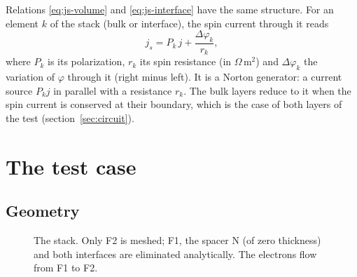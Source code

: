 \documentclass[11pt,a4paper]{article}
\newcommand{\vm}{\bm{m}}
\begin{document}
Relations \eqref{eq:js-volume} and \eqref{eq:js-interface} have the same
structure. For an element $k$ of the stack (bulk or interface), the spin
current through it reads
\begin{equation}
  j_s = P_k\,j + \frac{\Delta\varphi_k}{r_k},
  \label{eq:element}
\end{equation}
where $P_k$ is its polarization, $r_k$ its spin resistance (in
$\Omega\,$m$^2$) and $\Delta\varphi_k$ the variation of $\varphi$ through
it (right minus left). It is a Norton generator: a current source $P_kj$
in parallel with a resistance $r_k$. The bulk layers reduce to it when the
spin current is conserved at their boundary, which is the case of both
layers of the test (section~\ref{sec:circuit}).

\section{The test case}

\subsection{Geometry}

\begin{figure}[h]
\centering
{}
\caption{The stack. Only F2 is meshed; F1, the spacer N (of zero
  thickness) and both interfaces are eliminated analytically. The
  electrons flow from F1 to F2.}
\label{fig:stack}
\end{figure}
\end{document}
